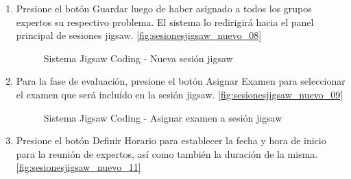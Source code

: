 \begin{enumerate}
\begin{figure}[h!]
	\end{figure}
	\item Presione el botón Guardar luego de haber asignado a todos los grupos expertos su respectivo problema. El sistema lo redirigirá hacia el panel principal de sesiones jigsaw. \autoref{fig:sesionesjigsaw_nuevo_08}
	\begin{figure}[h!]
		\centering
		\caption{Sistema Jigsaw Coding - Nueva sesión jigsaw}
		\label{fig:sesionesjigsaw_nuevo_08}
	\end{figure}
	\item Para la fase de evaluación, presione el botón Asignar Examen para seleccionar el examen que será incluído en la sesión jigsaw. \autoref{fig:sesionesjigsaw_nuevo_09}
	\begin{figure}[h!]
		\centering
		\caption{Sistema Jigsaw Coding - Asignar examen a sesión jigsaw}
		\label{fig:sesionesjigsaw_nuevo_09}
	\end{figure}
	\item Presione el botón Definir Horario para establecer la fecha y hora de inicio para la reunión de expertos, así como también la duración de la misma. \autoref{fig:sesionesjigsaw_nuevo_11}

\end{enumerate}

